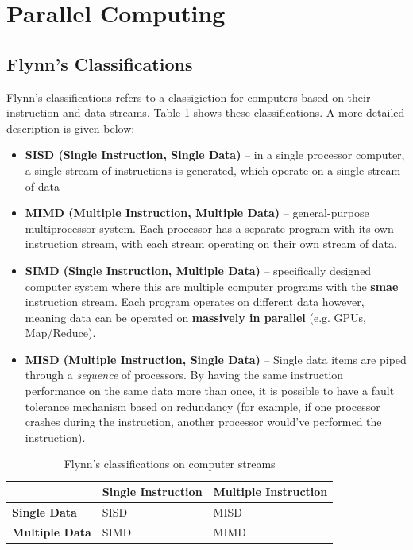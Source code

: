 \documentclass{article}
\begin{document}
\section{Parallel Computing}

\subsection{Flynn's Classifications}

Flynn's classifications refers to a classigiction for computers based on their instruction and data streams. Table \ref{tab:flynn} shows these classifications. A more detailed description is given below:
\begin{itemize}
	\item \textbf{SISD (Single Instruction, Single Data)} -- in a single processor computer, a single stream of instructions is generated, which operate on a single stream of data
	\item \textbf{MIMD (Multiple Instruction, Multiple Data)} -- general-purpose multiprocessor system. Each processor has a separate program with its own instruction stream, with each stream operating on their own stream of data.
	\item \textbf{SIMD (Single Instruction, Multiple Data)} -- specifically designed computer system where this are multiple computer programs with the \textbf{smae} instruction stream. Each program operates on different data however, meaning data can be operated on \textbf{massively in parallel} (e.g. GPUs, Map/Reduce).
	\item \textbf{MISD (Multiple Instruction, Single Data)} -- Single data items are piped through a \textit{sequence} of processors. By having the same instruction performance on the same data more than once, it is possible to have a fault tolerance mechanism based on redundancy (for example, if one processor crashes during the instruction, another processor would've performed the instruction).
\end{itemize}

\begin{table}
	\centering
	\begin{tabular}{|l|l|l|}
		\hline
		& \textbf{Single Instruction} & \textbf{Multiple Instruction} \\
		\hline
		\textbf{Single Data} & SISD & MISD \\
		\hline
		\textbf{Multiple Data} & SIMD & MIMD \\
		\hline
	\end{tabular}
	\caption{Flynn's classifications on computer streams}
	\label{tab:flynn}
\end{table}
\end{document}
